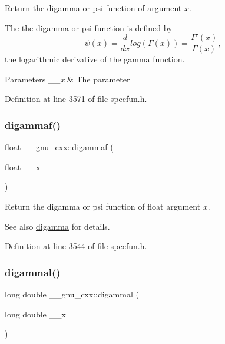 Return the digamma or psi function of argument $ x $.

The the digamma or psi function is defined by \[ \psi(x) = \frac{d}{dx}log\left(\Gamma(x)\right) = \frac{\Gamma'(x)}{\Gamma(x)}, \] the logarithmic derivative of the gamma function.


\begin{DoxyParams}{Parameters}
{\em \+\_\+\+\_\+x} & The parameter \\
\hline
\end{DoxyParams}


Definition at line 3571 of file specfun.\+h.

\mbox{\label{group__gnu__math__spec__func_ga65b58ffe1d02ccda1113539b62d87b94}} 
\subsubsection{\texorpdfstring{digammaf()}{digammaf()}}
{\footnotesize\ttfamily float \+\_\+\+\_\+gnu\+\_\+cxx\+::digammaf (\begin{DoxyParamCaption}\item[{float}]{\+\_\+\+\_\+x }\end{DoxyParamCaption})\hspace{0.3cm}{\ttfamily [inline]}}

Return the digamma or psi function of {\ttfamily float} argument $ x $.

\begin{DoxySeeAlso}{See also}
\hyperlink{group__gnu__math__spec__func_ga7b87300edf8754d959e1d94fe0c9246e}{digamma} for details. 
\end{DoxySeeAlso}


Definition at line 3544 of file specfun.\+h.

\mbox{\label{group__gnu__math__spec__func_gaaa1bf1503709175915cb81bcd4355ccf}} 
\subsubsection{\texorpdfstring{digammal()}{digammal()}}
{\footnotesize\ttfamily long double \+\_\+\+\_\+gnu\+\_\+cxx\+::digammal (\begin{DoxyParamCaption}\item[{long double}]{\+\_\+\+\_\+x }\end{DoxyParamCaption})\hspace{0.3cm}{\ttfamily [inline]}}

